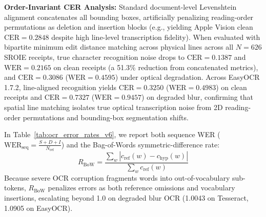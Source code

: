 \textbf{Order-Invariant CER Analysis:} Standard document-level Levenshtein alignment concatenates all bounding boxes, artificially penalizing reading-order permutations as deletion and insertion blocks (e.g., yielding Apple Vision clean $\text{CER} = 0.2848$ despite high line-level transcription fidelity). When evaluated with bipartite minimum edit distance matching across physical lines across all $N=626$ SROIE receipts, true character recognition noise drops to $\text{CER} = 0.1387$ and $\text{WER} = 0.2165$ on clean receipts (a 51.3\% reduction from concatenated metrics), and $\text{CER} = 0.3086$ ($\text{WER} = 0.4595$) under optical degradation. Across EasyOCR 1.7.2, line-aligned recognition yields $\text{CER} = 0.3250$ ($\text{WER} = 0.4983$) on clean receipts and $\text{CER} = 0.7327$ ($\text{WER} = 0.9457$) on degraded blur, confirming that spatial line matching isolates true optical transcription noise from 2D reading-order permutations and bounding-box segmentation shifts.

In Table~\ref{tab:ocr_error_rates_v6}, we report both sequence WER ($\text{WER}_{\text{seq}} = \frac{S+D+I}{N_{\text{ref}}}$) and the Bag-of-Words symmetric-difference rate:
\begin{equation}
    R_{\text{BoW}} = \frac{\sum_w |c_{\text{ref}}(w) - c_{\text{hyp}}(w)|}{\sum_w c_{\text{ref}}(w)}
\end{equation}
Because severe OCR corruption fragments words into out-of-vocabulary sub-tokens, $R_{\text{BoW}}$ penalizes errors as both reference omissions and vocabulary insertions, escalating beyond 1.0 on degraded blur OCR (1.0043 on Tesseract, 1.0905 on EasyOCR).

